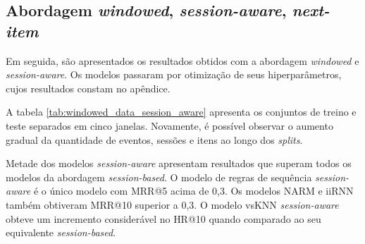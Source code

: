 \newpage

\subsection{Abordagem \textit{windowed}, \textit{session-aware}, \textit{next-item}}

Em seguida, são apresentados os resultados obtidos com a abordagem
\textit{windowed} e \textit{session-aware}. Os modelos passaram por otimização
de seus hiperparâmetros, cujos resultados constam no apêndice.

A tabela \ref{tab:windowed_data_session_aware} apresenta os conjuntos de treino
e teste separados em cinco janelas. Novamente, é possível observar o aumento
gradual da quantidade de eventos, sessões e itens ao longo dos \textit{splits}.

Metade dos modelos \textit{session-aware} apresentam resultados que superam
todos os modelos da abordagem \textit{session-based}. O modelo de regras de
sequência \textit{session-aware} é o único modelo com MRR@5 acima de 0,3. Os
modelos NARM e iiRNN também obtiveram MRR@10 superior a 0,3. O modelo vsKNN
\textit{session-aware} obteve um incremento considerável no HR@10 quando
comparado ao seu equivalente \textit{session-based}.


